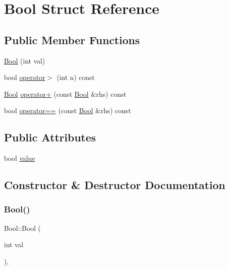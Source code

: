 \hypertarget{struct_bool}{}\section{Bool Struct Reference}
\label{struct_bool}
\subsection*{Public Member Functions}
\begin{DoxyCompactItemize}
\item 
\hyperlink{struct_bool_a03dfd4851b13abb29414887fcada7fca}{Bool} (int val)
\item 
bool \hyperlink{struct_bool_a7baecbc58992eb06157fbbbaa560be0b}{operator$>$} (int n) const
\item 
\hyperlink{struct_bool}{Bool} \hyperlink{struct_bool_a6f4ecdec19082e896cffce66e6b6e7cc}{operator+} (const \hyperlink{struct_bool}{Bool} \&rhs) const
\item 
bool \hyperlink{struct_bool_afe799a4977c5ebe4c215d5d4ebd77adb}{operator==} (const \hyperlink{struct_bool}{Bool} \&rhs) const
\end{DoxyCompactItemize}
\subsection*{Public Attributes}
\begin{DoxyCompactItemize}
\item 
bool \hyperlink{struct_bool_a16be863c269f988cdcbe59f9d846a141}{value}
\end{DoxyCompactItemize}


\subsection{Constructor \& Destructor Documentation}
\mbox{\label{struct_bool_a03dfd4851b13abb29414887fcada7fca}} 
\subsubsection{\texorpdfstring{Bool()}{Bool()}}
{\footnotesize\ttfamily Bool\+::\+Bool (\begin{DoxyParamCaption}\item[{int}]{val }\end{DoxyParamCaption})\hspace{0.3cm}{\ttfamily [inline]}, {\ttfamily [explicit]}}



